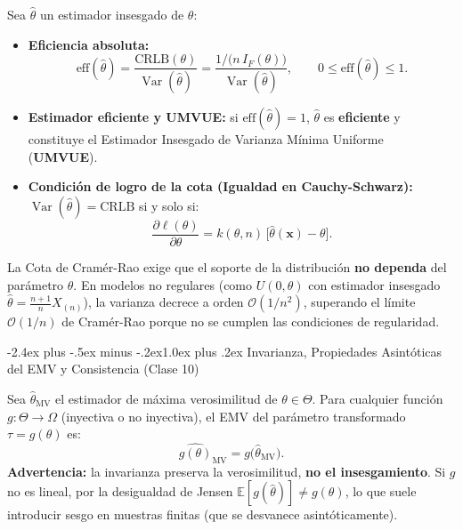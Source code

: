 \documentclass[10pt,a4paper]{article}
\makeatletter
\newcommand{\E}{\mathbb{E}}
\newcommand{\Var}{\operatorname{Var}}
\renewcommand\section{\@startsection{section}{1}{0pt}%
  {-2.4ex plus -.5ex minus -.2ex}{1.0ex plus .2ex}%
  {\normalfont\large\bfseries\color{seccolor}}}
\makeatother
\begin{document}
\begin{thmbox}[frametitle={Eficiencia absoluta y estimador UMVUE}]
Sea $\hat\theta$ un estimador insesgado de $\theta$:
\begin{itemize}
  \item \textbf{Eficiencia absoluta:}
  \[
  \text{eff}(\hat\theta) = \frac{\text{CRLB}(\theta)}{\Var(\hat\theta)} = \frac{1/\big(n\,I_F(\theta)\big)}{\Var(\hat\theta)}, \qquad 0 \le \text{eff}(\hat\theta) \le 1.
  \]
  \item \textbf{Estimador eficiente y UMVUE:} si $\text{eff}(\hat\theta) = 1$, $\hat\theta$ es \textbf{eficiente} y constituye el Estimador Insesgado de Varianza Mínima Uniforme (\textbf{UMVUE}).
  \item \textbf{Condición de logro de la cota (Igualdad en Cauchy-Schwarz):} $\Var(\hat\theta) = \text{CRLB}$ si y solo si:
  \[
  \frac{\partial \ell(\theta)}{\partial \theta} = k(\theta, n)\,\big[\hat\theta(\mathbf{x}) - \theta\big].
  \]
\end{itemize}
\end{thmbox}

\begin{warnbox}[frametitle={Condiciones de regularidad de Cramér-Rao y excepciones}]
La Cota de Cramér-Rao exige que el soporte de la distribución \textbf{no dependa} del parámetro $\theta$. En modelos no regulares (como $U(0,\theta)$ con estimador insesgado $\hat\theta = \frac{n+1}{n}X_{(n)}$), la varianza decrece a orden $\mathcal{O}(1/n^2)$, superando el límite $\mathcal{O}(1/n)$ de Cramér-Rao porque no se cumplen las condiciones de regularidad.
\end{warnbox}

\section{Invarianza, Propiedades Asintóticas del EMV y Consistencia \textmd{(Clase 10)}}

\begin{thmbox}[frametitle={Principio de Invarianza de Zehna (EMV de funciones)}]
Sea $\hat\theta_{\text{MV}}$ el estimador de máxima verosimilitud de $\theta\in\Theta$. Para cualquier función $g: \Theta \to \Omega$ (inyectiva o no inyectiva), el EMV del parámetro transformado $\tau = g(\theta)$ es:
\[
\widehat{g(\theta)}_{\text{MV}} = g\big(\hat\theta_{\text{MV}}\big).
\]
\textbf{Advertencia:} la invarianza preserva la verosimilitud, \textbf{no el insesgamiento}. Si $g$ no es lineal, por la desigualdad de Jensen $\E[g(\hat\theta)] \ne g(\theta)$, lo que suele introducir sesgo en muestras finitas (que se desvanece asintóticamente).
\end{thmbox}
\end{document}

